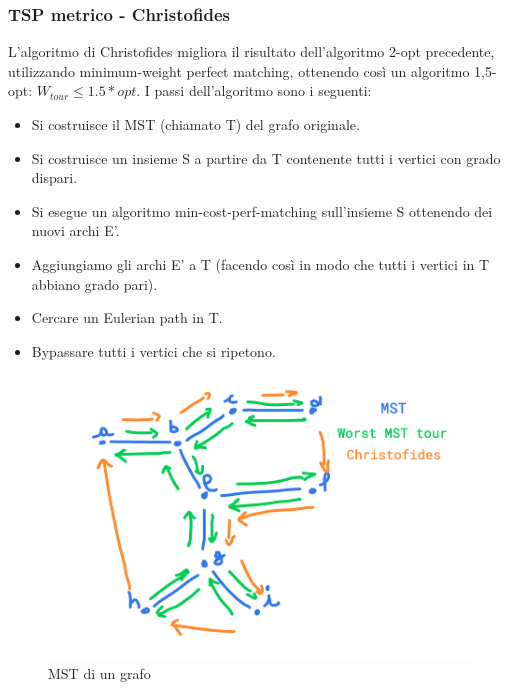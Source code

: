 \documentclass[12pt,a4paper]{article}
\begin{document}
\subsubsection{TSP metrico - Christofides}
L'algoritmo di Christofides migliora il risultato dell'algoritmo 2-opt precedente, utilizzando minimum-weight perfect matching, ottenendo così un algoritmo 1,5-opt: $W_{tour} \leq 1.5 * opt$. I passi dell'algoritmo sono i seguenti:
\begin{itemize}
\item Si costruisce il MST (chiamato T) del grafo originale.
\item Si costruisce un insieme S a partire da T contenente tutti i vertici con grado dispari.
\item Si esegue un algoritmo min-cost-perf-matching sull'insieme S ottenendo dei nuovi archi E'.
\item Aggiungiamo gli archi E' a T (facendo così in modo che tutti i vertici in T abbiano grado pari).
\item Cercare un Eulerian path in T.
\item Bypassare tutti i vertici che si ripetono.

\end{itemize}

\begin{figure}[h]
	\centering
	\includegraphics[width=1\linewidth]{img/Christofides}
	\caption{MST di un grafo}
	\label{fig:10}
\end{figure}
\end{document}
